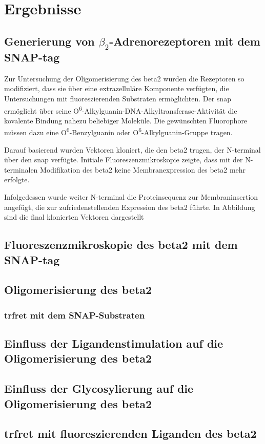 \chapter{Ergebnisse} \label{chapter:ergebnisse}
\section{Generierung von $\beta_2$-Adrenorezeptoren mit dem SNAP-tag}
Zur Untersuchung der Oligomerisierung des \gls{beta2} wurden die Rezeptoren so modifiziert, dass sie über eine extrazelluläre Komponente verfügten, die Untersuchungen mit fluoreszierenden Substraten ermöglichten. Der \gls{snap} ermöglicht über seine O\textsuperscript{6}-Alkylguanin-DNA-Alkyltransferase-Aktivität die kovalente Bindung nahezu beliebiger Moleküle. Die gewünschten Fluorophore müssen dazu eine O\textsuperscript{6}-Benzylguanin oder O\textsuperscript{6}-Alkylguanin-Gruppe tragen.

Darauf basierend wurden Vektoren kloniert, die den \gls{beta2} trugen, der N-terminal über den \gls{snap} verfügte. Initiale Fluoreszenzmikroskopie zeigte, dass mit der N-terminalen Modifikation des \gls{beta2} keine Membranexpression des \gls{beta2} mehr erfolgte.



Infolgedessen wurde weiter N-terminal die Proteinsequenz zur Membraninsertion angefügt, die zur zufriedenstellenden Expression des \gls{beta2} führte. In Abbildung %
sind die final klonierten Vektoren dargestellt  
\section{Fluoreszenzmikroskopie des \gls{beta2} mit dem SNAP-tag}

\section{Oligomerisierung des \gls{beta2}}
\subsection{\gls{trfret} mit dem SNAP-Substraten}

\section{Einfluss der Ligandenstimulation auf die Oligomerisierung des \gls{beta2}}

\section{Einfluss der Glycosylierung auf die Oligomerisierung des \gls{beta2}}

\section{\gls{trfret} mit fluoreszierenden Liganden des \gls{beta2}}

